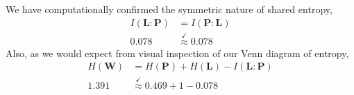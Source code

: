 We have computationally confirmed the symmetric nature of shared entropy,
\begin{align*}
I(\bm{L} : \bm{P})
&=
I(\bm{P} : \bm{L}) \\
0.078
&\stackrel{\checkmark}{\approx}
0.078
\end{align*}
Also, as we would expect from visual inspection of our Venn diagram of entropy,
\begin{align*}
H(\bm{W})
&=
H(\bm{P}) + H(\bm{L}) - I(\bm{L} : \bm{P}) \\
1.391
&\stackrel{\checkmark}{\approx}
0.469 + 1 - 0.078
\end{align*}
